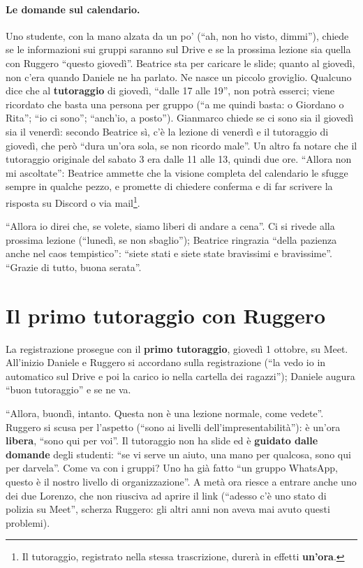 \paragraph{Le domande sul calendario.} Uno studente, con la mano alzata da un po'
(``ah, non ho visto, dimmi''), chiede se le informazioni sui gruppi saranno sul Drive
e se la prossima lezione sia quella con Ruggero ``questo giovedì''. Beatrice sta per
caricare le slide; quanto al giovedì, non c'era quando Daniele ne ha parlato. Ne nasce
un piccolo groviglio. Qualcuno dice che al \textbf{tutoraggio} di giovedì, ``dalle 17
alle 19'', non potrà esserci; viene ricordato che basta una persona per gruppo (``a
me quindi basta: o Giordano o Rita''; ``io ci sono''; ``anch'io, a posto''). Gianmarco
chiede se ci sono sia il giovedì sia il venerdì: secondo Beatrice sì, c'è la lezione
di venerdì e il tutoraggio di giovedì, che però ``dura un'ora sola, se non ricordo
male''. Un altro fa notare che il tutoraggio originale del sabato 3 era dalle 11 alle
13, quindi due ore. ``Allora non mi ascoltate'': Beatrice ammette che la visione
completa del calendario le sfugge sempre in qualche pezzo, e promette di chiedere
conferma e di far scrivere la risposta su Discord o via mail\footnote{Il tutoraggio,
registrato nella stessa trascrizione, durerà in effetti \textbf{un'ora}.}.

``Allora io direi che, se volete, siamo liberi di andare a cena''. Ci si rivede alla
prossima lezione (``lunedì, se non sbaglio''); Beatrice ringrazia ``della pazienza
anche nel caos tempistico'': ``siete stati e siete state bravissimi e bravissime''.
``Grazie di tutto, buona serata''.

\section{Il primo tutoraggio con Ruggero}
\label{a7:sec:tutoraggio}

La registrazione prosegue con il \textbf{primo tutoraggio}, giovedì 1 ottobre, su
Meet. All'inizio Daniele e Ruggero si accordano sulla registrazione (``la vedo io in
automatico sul Drive e poi la carico io nella cartella dei ragazzi''); Daniele augura
``buon tutoraggio'' e se ne va.

``Allora, buondì, intanto. Questa non è una lezione normale, come vedete''. Ruggero si
scusa per l'aspetto (``sono ai livelli dell'impresentabilità''): è un'ora
\textbf{libera}, ``sono qui per voi''. Il tutoraggio non ha slide ed è \textbf{guidato
dalle domande} degli studenti: ``se vi serve un aiuto, una mano per qualcosa, sono qui
per darvela''. Come va con i gruppi? Uno ha già fatto ``un gruppo WhatsApp, questo è il
nostro livello di organizzazione''. A metà ora riesce a entrare anche uno dei due Lorenzo, che non
riusciva ad aprire il link (``adesso c'è uno stato di polizia su Meet'', scherza
Ruggero: gli altri anni non aveva mai avuto questi problemi).

